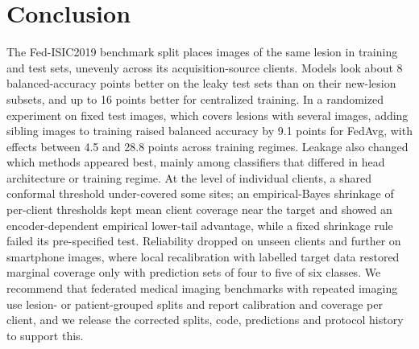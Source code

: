 \section{Conclusion}
\label{sec:conclusion}

The Fed-ISIC2019 benchmark split places images of the same lesion in training and test sets, unevenly
across its acquisition-source clients. Models look about 8 balanced-accuracy points better on the leaky
test sets than on their new-lesion subsets, and up to 16 points better for centralized training.
In a randomized experiment on fixed test images, which covers lesions with several images, adding sibling
images to training raised balanced accuracy by 9.1 points for FedAvg, with effects between 4.5 and 28.8
points across training regimes. Leakage also changed which methods appeared best, mainly among classifiers
that differed in head architecture or training regime. At the level of individual clients, a shared conformal threshold under-covered some
sites; an empirical-Bayes shrinkage of per-client thresholds kept mean client coverage near the target and
showed an encoder-dependent empirical lower-tail advantage, while a fixed shrinkage rule failed its pre-specified test. Reliability dropped on unseen clients and further on smartphone images, where local recalibration with labelled target data restored marginal coverage only with prediction sets of four to five of six classes. We recommend that federated medical
imaging benchmarks with repeated imaging use lesion- or patient-grouped splits and report calibration and
coverage per client, and we release the corrected splits, code, predictions and protocol history to
support this.
